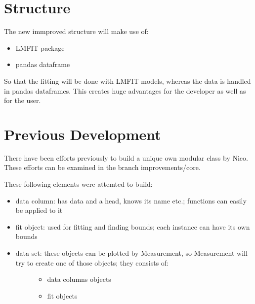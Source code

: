 \documentclass[letterpaper,10pt,english]{sphinxmanual}
\begin{document}
\section{Structure}
\label{\detokenize{measurement2:structure}}
The new immproved structure will make use of:
\begin{itemize}
\item {} 
LMFIT package

\item {} 
pandas dataframe

\end{itemize}

So that the fitting will be done with LMFIT models, whereas the data is handled in pandas dataframes. This creates huge advantages for the developer as well as for the user.


\section{Previous Development}
\label{\detokenize{measurement2:previous-development}}
There have been efforts previously to build a unique own modular  class by Nico. These efforts can be examined in the branch improvements/core.

These following elements were attemted to build:
\begin{itemize}
\item {} 
data column: has data and a head, knows its name etc.; functions can easily be applied to it

\item {} 
fit object: used for fitting and finding bounds; each instance can have its own bounds

\item {} \begin{description}
\item[{data set: these objects can be plotted by Measurement, so Measurement will try to create one of those objects; they consists of:}] \leavevmode\begin{itemize}
\item {} 
data columns objects

\item {} 
fit objects

\end{itemize}

\end{description}

\end{itemize}
\end{document}

